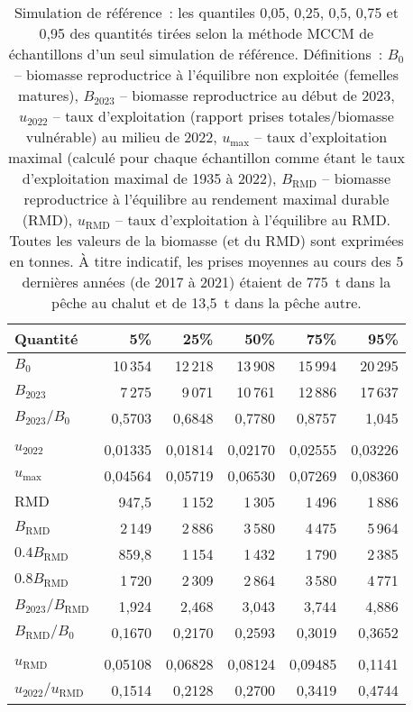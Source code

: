 \documentclass[11pt]{book}
\begin{document}
\begin{table}[ht]
\centering
\caption{Simulation de r\'{e}f\'{e}rence~: les quantiles 0,05, 0,25, 0,5, 0,75 et 0,95 des quantit\'{e}s tir\'{e}es selon la m\'{e}thode MCCM de \Nbase{} \'{e}chantillons d'un seul simulation de r\'{e}f\'{e}rence. D\'{e}finitions~: $B_0$ -- biomasse reproductrice \`{a} l'\'{e}quilibre non exploit\'{e}e (femelles matures), $B_{2023}$ -- biomasse reproductrice au d\'{e}but de 2023, $u_{2022}$ -- taux d'exploitation (rapport prises totales/biomasse vuln\'{e}rable) au milieu de 2022, $u_\text{max}$ -- taux d'exploitation maximal (calcul\'{e} pour chaque \'{e}chantillon comme \'{e}tant le taux d'exploitation maximal de 1935 \`{a} 2022), $B_\text{RMD}$ -- biomasse reproductrice \`{a} l'\'{e}quilibre au rendement maximal durable (RMD), $u_\text{RMD}$ -- taux d'exploitation \`{a} l'\'{e}quilibre au RMD. Toutes les valeurs de la biomasse (et du RMD) sont exprim\'{e}es en tonnes. \`{A} titre indicatif, les prises moyennes au cours des 5 derni\`{e}res ann\'{e}es (de 2017 \`{a} 2021) \'{e}taient de 775~t dans la p\^{e}che au chalut et de 13,5~t dans la p\^{e}che autre.} 
\label{tab:car.base.rfpt}
\begin{tabular}{lrrrrr}
  \\[-1.0ex] \hline
Quantit\'{e} & 5\% & 25\% & 50\% & 75\% & 95\% \\ 
  \hline
$B_{0}$ & 10\,354 & 12\,218 & 13\,908 & 15\,994 & 20\,295 \\ 
  $B_{2023}$ & 7\,275 & 9\,071 & 10\,761 & 12\,886 & 17\,637 \\ 
  $B_{2023}/B_{0}$ & 0,5703 & 0,6848 & 0,7780 & 0,8757 & 1,045 \\ 
   \hdashline \\[-1.75ex]$u_{2022}$ & 0,01335 & 0,01814 & 0,02170 & 0,02555 & 0,03226 \\ 
  $u_\text{max}$ & 0,04564 & 0,05719 & 0,06530 & 0,07269 & 0,08360 \\ 
   \hline
$\text{RMD}$ & 947,5 & 1\,152 & 1\,305 & 1\,496 & 1\,886 \\ 
  $B_\text{RMD}$ & 2\,149 & 2\,886 & 3\,580 & 4\,475 & 5\,964 \\ 
  $0.4B_{\text{RMD}}$ & 859,8 & 1\,154 & 1\,432 & 1\,790 & 2\,385 \\ 
  $0.8B_{\text{RMD}}$ & 1\,720 & 2\,309 & 2\,864 & 3\,580 & 4\,771 \\ 
  $B_{2023}/B_\text{RMD}$ & 1,924 & 2,468 & 3,043 & 3,744 & 4,886 \\ 
  $B_\text{RMD}/B_{0}$ & 0,1670 & 0,2170 & 0,2593 & 0,3019 & 0,3652 \\ 
   \hdashline \\[-1.75ex]$u_\text{RMD}$ & 0,05108 & 0,06828 & 0,08124 & 0,09485 & 0,1141 \\ 
  $u_{2022}/u_\text{RMD}$ & 0,1514 & 0,2128 & 0,2700 & 0,3419 & 0,4744 \\ 
   \hline
\end{tabular}
\end{table}
\setlength{\tabcolsep}{2pt}
\end{document}
